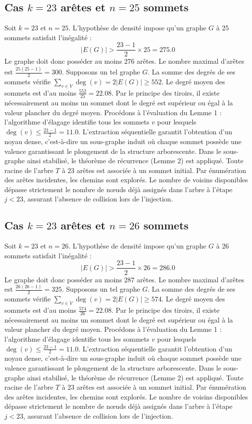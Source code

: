 \documentclass[12pt,a4paper]{article}
\begin{document}
\subsection{Cas $k = 23$ arêtes et $n = 25$ sommets}
Soit $k = 23$ et $n = 25$. L'hypothèse de densité impose qu'un graphe $G$ à 25 sommets satisfait l'inégalité :
$$ |E(G)| > \frac{23-1}{2} \times 25 = 275.0 $$
Le graphe doit donc posséder au moins $276$ arêtes. Le nombre maximal d'arêtes est $\frac{25(25-1)}{2} = 300$.
Supposons un tel graphe $G$. La somme des degrés de ses sommets vérifie $\sum_{v \in V} \deg(v) = 2|E(G)| \geq 552$.
Le degré moyen des sommets est d'au moins $\frac{552}{25} = 22.08$.
Par le principe des tiroirs, il existe nécessairement au moins un sommet dont le degré est supérieur ou égal à la valeur plancher du degré moyen.
Procédons à l'évaluation du Lemme 1 : l'algorithme d'élagage identifie tous les sommets $v$ pour lesquels $\deg(v) \leq \frac{23-1}{2} = 11.0$.
L'extraction séquentielle garantit l'obtention d'un noyau dense, c'est-à-dire un sous-graphe induit où chaque sommet possède une valence garantissant le plongement de la structure arborescente.
Dans le sous-graphe ainsi stabilisé, le théorème de récurrence (Lemme 2) est appliqué. Toute racine de l'arbre $T$ à 23 arêtes est associée à un sommet initial. Par énumération des arêtes incidentes, les chemins sont explorés. Le nombre de voisins disponibles dépasse strictement le nombre de nœuds déjà assignés dans l'arbre à l'étape $j < 23$, assurant l'absence de collision lors de l'injection.

\subsection{Cas $k = 23$ arêtes et $n = 26$ sommets}
Soit $k = 23$ et $n = 26$. L'hypothèse de densité impose qu'un graphe $G$ à 26 sommets satisfait l'inégalité :
$$ |E(G)| > \frac{23-1}{2} \times 26 = 286.0 $$
Le graphe doit donc posséder au moins $287$ arêtes. Le nombre maximal d'arêtes est $\frac{26(26-1)}{2} = 325$.
Supposons un tel graphe $G$. La somme des degrés de ses sommets vérifie $\sum_{v \in V} \deg(v) = 2|E(G)| \geq 574$.
Le degré moyen des sommets est d'au moins $\frac{574}{26} = 22.08$.
Par le principe des tiroirs, il existe nécessairement au moins un sommet dont le degré est supérieur ou égal à la valeur plancher du degré moyen.
Procédons à l'évaluation du Lemme 1 : l'algorithme d'élagage identifie tous les sommets $v$ pour lesquels $\deg(v) \leq \frac{23-1}{2} = 11.0$.
L'extraction séquentielle garantit l'obtention d'un noyau dense, c'est-à-dire un sous-graphe induit où chaque sommet possède une valence garantissant le plongement de la structure arborescente.
Dans le sous-graphe ainsi stabilisé, le théorème de récurrence (Lemme 2) est appliqué. Toute racine de l'arbre $T$ à 23 arêtes est associée à un sommet initial. Par énumération des arêtes incidentes, les chemins sont explorés. Le nombre de voisins disponibles dépasse strictement le nombre de nœuds déjà assignés dans l'arbre à l'étape $j < 23$, assurant l'absence de collision lors de l'injection.
\end{document}
